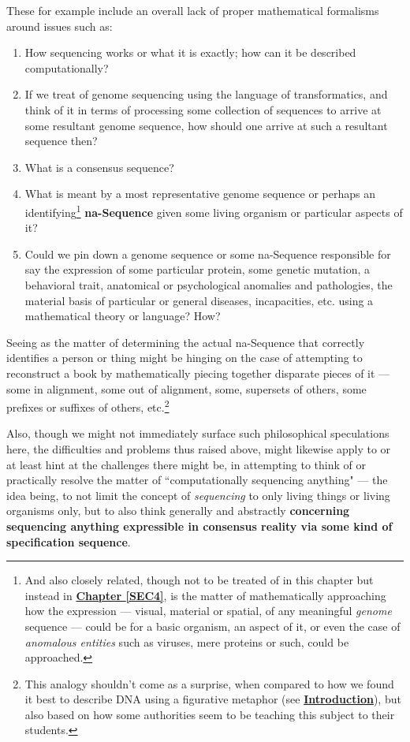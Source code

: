 \documentclass[a4paper, 18pt]{book} %
\begin{document}
These for example include an overall lack of proper mathematical formalisms around  issues such as:

\begin{enumerate}
\item How sequencing works or what it is exactly; how can it be described computationally?
\item If we treat of genome sequencing using the language of transformatics, and think of it in terms of processing some collection of sequences to arrive at some resultant genome sequence, how should one arrive at such a resultant sequence then? 
\item What is a consensus sequence?
\item What is meant by a most representative genome sequence or perhaps an identifying\footnote{And also closely related, though not to be treated of in this chapter but instead in \textbf{\hyperref[SEC4]{Chapter \ref{SEC4}}}, is the matter of mathematically approaching how the expression --- visual, material or spatial, of any meaningful \textit{genome} sequence --- could be for a basic organism, an aspect of it, or even the case of \textit{anomalous entities} such as viruses, mere proteins or such, could be approached.} \textbf{na-Sequence} given some living organism or particular aspects of it?
\item Could we pin down a genome sequence or some na-Sequence responsible for say the expression of some particular protein, some genetic mutation, a behavioral trait, anatomical or psychological anomalies and pathologies, the material basis of particular or general diseases, incapacities, etc. using a mathematical theory or language? How?
\end{enumerate}

Seeing as the matter of determining the actual na-Sequence that correctly identifies a person or thing might be hinging on the case of attempting to reconstruct a book by mathematically piecing together disparate pieces of it --- some in alignment, some out of alignment, some, supersets of  others, some prefixes or suffixes of others, etc.\footnote{This analogy shouldn't come as a surprise, when compared to how we found it best to describe DNA using a figurative metaphor (see \textbf{\hyperref[SEC1]{Introduction}}), but also based on how some authorities seem to be teaching this subject to their students\cite{przytycka_wgs_lecture10}.} 


Also, though we might not immediately surface such philosophical speculations here, the difficulties and problems thus raised above, might likewise apply to or at least hint at the challenges there might be, in attempting to think of or practically resolve the matter of ``computationally sequencing anything" --- the idea being, to not limit the concept of \textit{sequencing} to only living things or living organisms only, but to also think generally and abstractly \textbf{concerning sequencing anything expressible in consensus reality via some kind of specification sequence}. 
\end{document}
